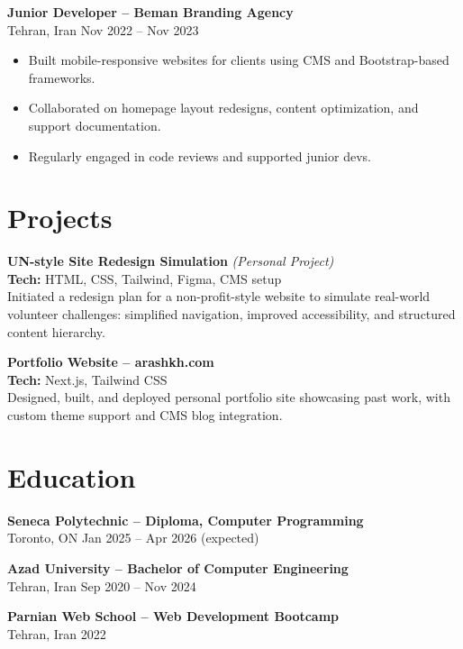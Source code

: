\documentclass[letterpaper,11pt]{article}
\begin{document}
\textbf{Junior Developer – Beman Branding Agency}\\
Tehran, Iran \hfill Nov 2022 -- Nov 2023
\begin{itemize}[leftmargin=*]
  \item Built mobile-responsive websites for clients using CMS and Bootstrap-based frameworks.
  \item Collaborated on homepage layout redesigns, content optimization, and support documentation.
  \item Regularly engaged in code reviews and supported junior devs.
\end{itemize}

\section*{Projects}
\textbf{UN-style Site Redesign Simulation} \textit{(Personal Project)}\\
\textbf{Tech:} HTML, CSS, Tailwind, Figma, CMS setup\\
Initiated a redesign plan for a non-profit-style website to simulate real-world volunteer challenges: simplified navigation, improved accessibility, and structured content hierarchy.

\textbf{Portfolio Website – arashkh.com}\\
\textbf{Tech:} Next.js, Tailwind CSS\\
Designed, built, and deployed personal portfolio site showcasing past work, with custom theme support and CMS blog integration.

\section*{Education}
\textbf{Seneca Polytechnic – Diploma, Computer Programming}\\
Toronto, ON \hfill Jan 2025 -- Apr 2026 (expected)

\textbf{Azad University – Bachelor of Computer Engineering}\\
Tehran, Iran \hfill Sep 2020 -- Nov 2024

\textbf{Parnian Web School – Web Development Bootcamp}\\
Tehran, Iran \hfill 2022
\end{document}
